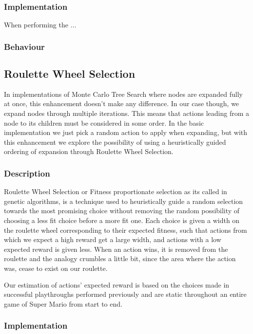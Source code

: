 \documentclass[10pt,a4paper]{article}
\begin{document}
\subsubsection{Implementation}
When performing the ...
\subsubsection{Behaviour}
\subsection{Roulette Wheel Selection}
\label{roulette}
In implementations of Monte Carlo Tree Search where nodes are expanded fully at once, this enhancement doesn't make any difference. In our case though, we expand nodes through multiple iterations. This means that actions leading from a node to its children must be considered in some order. In the basic implementation we just pick a random action to apply when expanding, but with this enhancement we explore the possibility of using a heuristically guided ordering of expansion through Roulette Wheel Selection.

\subsubsection{Description}
Roulette Wheel Selection or Fitness proportionate selection as its called in genetic algorithms, is a technique used to heuristically guide a random selection towards the most promising choice without removing the random possibility of choosing a less fit choice before a more fit one. Each choice is given a width on the roulette wheel corresponding to their expected fitness, such that actions from which we expect a high reward get a large width, and actions with a low expected reward is given less.
When an action wins, it is removed from the roulette and the analogy crumbles a little bit, since the area where the action was, cease to exist on our roulette.

Our estimation of actions' expected reward is based on the choices made in successful playthroughs performed previously and are static throughout an entire game of Super Mario from start to end.

\subsubsection{Implementation}
\end{document}
